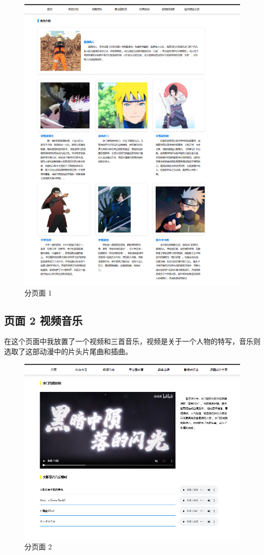 \documentclass[supercite]{Experimental_Report}
\theoremstyle{definition}
\begin{document}
\begin{figure}[h]
	\centering
	\includegraphics[scale=0.3]{images/2-2.png}
	\caption{分页面 1}
	\label{fig2-2}
\end{figure}


\newpage

\subsection{页面 2 视频音乐}
在这个页面中我放置了一个视频和三首音乐，视频是关于一个人物的特写，音乐则选取了这部动漫中的片头片尾曲和插曲。
\begin{figure}[h]
	\centering
\includegraphics[scale=0.25]{images/2-3.png}
\caption{分页面 2}
\label{fig2-3}
\end{figure}
\end{document}
